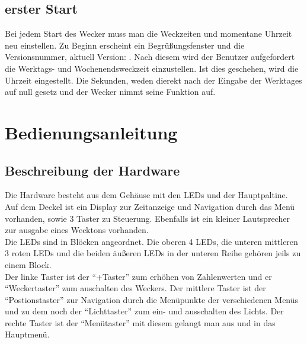 \documentclass[12pt,a4paper,titlepage,headinclude]{scrartcl}
\numberwithin{equation}{subsection}
\begin{document}
\subsection{erster Start}
Bei jedem Start des Wecker muss man die Weckzeiten und momentane Uhrzeit neu einstellen.
Zu Beginn erscheint ein Begrüßungsfenster und die Versionsnummer, aktuell Version: \titel.
Nach diesem wird der Benutzer aufgefordert die Werktags- und Wochenendsweckzeit einzustellen.
Ist dies geschehen, wird die Uhrzeit eingestellt.
Die Sekunden, weden dierekt nach der Eingabe der Werktages auf null gesetz und der Wecker nimmt seine Funktion auf.


\newpage
\section{Bedienungsanleitung}
\label{sec:Bedienungsanleitung}

\subsection{Beschreibung der Hardware}
Die Hardware besteht aus dem Gehäuse mit den LEDs und der Hauptpaltine.
Auf dem Deckel ist ein Display zur Zeitanzeige und Navigation durch das Menü vorhanden, sowie 3 Taster zu Steuerung.
Ebenfalls ist ein kleiner Lautsprecher zur ausgabe eines Wecktons vorhanden.\\
Die LEDs sind in Blöcken angeordnet.
Die oberen 4 LEDs, die unteren mittleren 3 roten LEDs und die beiden äußeren LEDs in der unteren Reihe gehören jeils zu einem Block.\\
Der linke Taster ist der "`+Taster"' zum erhöhen von Zahlenwerten und er "`Weckertaster"' zum auschalten des Weckers.
Der mittlere Taster ist der "`Postionstaster"' zur Navigation durch die Menüpunkte der verschiedenen Menüs und zu dem noch der "`Lichttaster"' zum ein- und ausschalten des Lichts.
Der rechte Taster ist der "`Menütaster"' mit diesem gelangt man aus und in das Hauptmenü.
\end{document}
